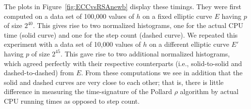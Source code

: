 \documentclass{llncs}
\numberwithin{equation}{section}
\renewcommand\({\left(}
\renewcommand\){\right)}
\begin{document}
The plots in   Figure~\ref{fig:ECCvsRSAnewb} display these timings.  They were
 first computed on a data set of  100,000 values of $h$ on a fixed elliptic curve $E$ having $p$ of size $2^{40}$.  This gives rise to two normalized histograms, one  for the actual CPU time (solid curve) and one for the step count (dashed curve).
  We repeated this experiment with a data set of 10,000 values of $h$ on a different elliptic curve  $E'$ having $p$ of size $2^{45}$.  This gave rise to two additional normalized histograms, which agreed perfectly with their respective counterparts (i.e., solid-to-solid and dashed-to-dashed) from $E$.  From these computations we see  in addition that the solid and dashed curves are very close to each other; that is, there is little difference in measuring the time-signature of the Pollard $\rho$ algorithm by actual CPU running times as opposed to step count.
\end{document}
